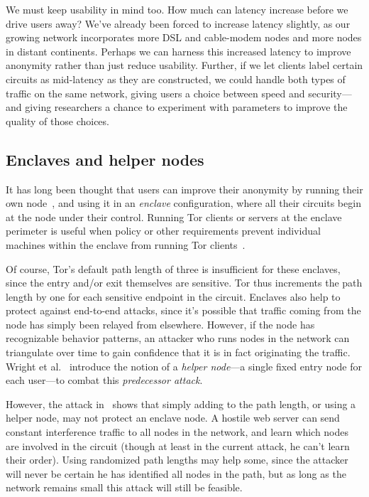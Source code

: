 \documentclass{llncs}
\begin{document}
We must keep usability in mind too. How much can latency increase
before we drive users away? We've already been forced to increase
latency slightly, as our growing network incorporates more DSL and
cable-modem nodes and more nodes in distant continents. Perhaps we can
harness this increased latency to improve anonymity rather than just
reduce usability. Further, if we let clients label certain circuits as
mid-latency as they are constructed, we could handle both types of traffic
on the same network, giving users a choice between speed and security---and
giving researchers a chance to experiment with parameters to improve the
quality of those choices.

\subsection{Enclaves and helper nodes}
\label{subsec:helper-nodes}

It has long been thought that users can improve their anonymity by
running their own node~\cite{tor-design,or-ih96,or-pet00}, and using
it in an \emph{enclave} configuration, where all their circuits begin
at the node under their control. Running Tor clients or servers at
the enclave perimeter is useful when policy or other requirements
prevent individual machines within the enclave from running Tor
clients~\cite{or-jsac98,or-discex00}.

Of course, Tor's default path length of
three is insufficient for these enclaves, since the entry and/or exit
themselves are sensitive. Tor thus increments the path length by one
for each sensitive endpoint in the circuit.
Enclaves also help to protect against end-to-end attacks, since it's
possible that traffic coming from the node has simply been relayed from
elsewhere. However, if the node has recognizable behavior patterns,
an attacker who runs nodes in the network can triangulate over time to
gain confidence that it is in fact originating the traffic. Wright et
al.~\cite{wright03} introduce the notion of a \emph{helper node}---a
single fixed entry node for each user---to combat this \emph{predecessor
attack}.

However, the attack in~\cite{attack-tor-oak05} shows that simply adding
to the path length, or using a helper node, may not protect an enclave
node. A hostile web server can send constant interference traffic to
all nodes in the network, and learn which nodes are involved in the
circuit (though at least in the current attack, he can't learn their
order). Using randomized path lengths may help some, since the attacker
will never be certain he has identified all nodes in the path, but as
long as the network remains small this attack will still be feasible.
\end{document}
